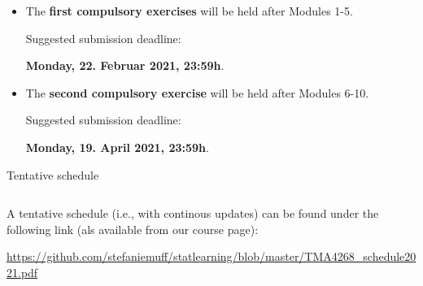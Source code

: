 \documentclass[10pt,ignorenonframetext,]{beamer}
\begin{document}
\begin{frame}

\begin{itemize}
\item
  The \textbf{first compulsory exercises} will be held after Modules
  1-5.

  \hspace{8mm}

  Suggested submission deadline:

  \hspace{8mm}

  \textbf{Monday, 22. Februar 2021, 23:59h}.
\end{itemize}

\vspace{8mm}

\begin{itemize}
\item
  The \textbf{second compulsory exercise} will be held after Modules
  6-10.

  \hspace{8mm}

  Suggested submission deadline:

  \hspace{8mm}

  \textbf{Monday, 19. April 2021, 23:59h}.
\end{itemize}

\end{frame}

\begin{frame}

\begin{block}{Tentative schedule}

\(~\)

A tentative schedule (i.e., with continous updates) can be found under
the following link (als available from our course page):

\vspace{2mm}

\url{https://github.com/stefaniemuff/statlearning/blob/master/TMA4268_schedule2021.pdf}

\end{block}

\end{frame}
\end{document}

